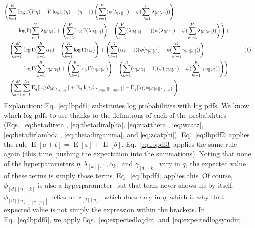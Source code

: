 \documentclass[12pt]{article}
\newcommand\numberthis{\addtocounter{equation}{1}\tag{\theequation}}
\newcommand{\E}{\operatorname{E}}
\begin{document}
\begin{align*}
    &\begin{aligned}
    &\begin{aligned}\left(\sum_{k=1}^{K} \right. &\log \Gamma(V\eta)
    - V \log \Gamma(\eta) + (\eta - 1) \left(\sum_{v=1}^{V}
    (\psi(\lambda_{[k][v]}) - \psi(\sum_{v'=1}^{V} \lambda_{[k][v']}))\right) -
    \\*
    &\left. \log \Gamma(\sum_{v=1}^{V} \lambda_{[k][v]}) +
    \left(\sum_{v=1}^{V} \log \Gamma(\lambda_{[k][v]}) \right) -
    \left(\sum_{v=1}^{V} (\lambda_{[k][v]} - 1)
    (\psi(\lambda_{[k][v]}) - \psi(\sum_{v'=1}^{V} \lambda_{[k][v']}))
    \right)\right) +\end{aligned} \\*
    &\quad\begin{aligned}\left(\sum_{d=1}^{M}\right. &\left.\log \Gamma
    (\sum_{k=1}^{K} \alpha_{k}) -
    \left(\sum_{k=1}^{K}\log \Gamma(\alpha_{k})\right) +
    \left(\sum_{k=1}^{K}(\alpha_{k} - 1)
    (\psi(\gamma_{[d][v]}) - \psi(\sum_{k'=1}^{K} \gamma_{[d][k']}))
    \right)
    \right. - \\*
    &\left.\log \Gamma(\sum_{k=1}^{K} \gamma_{[d][k]}) +
    \left(\sum_{k=1}^{K} \log \Gamma(\gamma_{[d][k]})\right) -
    \left(\sum_{k=1}^{K} (\gamma_{[d][k]} - 1)
    (\psi(\gamma_{[d][v]}) - \psi(\sum_{k'=1}^{K} \gamma_{[d][k']}))
    \right)\right) +
    \end{aligned}\\*
    &\quad\begin{aligned}
    \left(\sum_{d=1}^{M}\sum_{n=1}^{N_{d}} \E_{q}[\log \theta_{[d][z_{[d][n]}]}]
    + \E_{q}[\log \beta_{[z_{[d][n]}][w_{[d][n]}]}] -
    \E_{q}[\log \phi_{[d][n][z_{[d][n]}]}]\right).
    \end{aligned}
    \end{aligned}\numberthis\label{eq:lbpdf5}\\
\end{align*}
Explanation:  Eq.~\ref{eq:lbpdf1} substitutes log probabilities with log pdfs.
We know which log pdfs to use thanks to the definitions of each of the
probabilities (Eqs.~\ref{eq:betadireta}, \ref{eq:thetadiralpha},
\ref{eq:zcattheta}, \ref{eq:wcatz}, \ref{eq:betadirlambda},
\ref{eq:thetadirgamma}, and \ref{eq:zcatphi}).  Eq.~\ref{eq:lbpdf2} applies the
rule $\E[a+b] = \E[a]+\E[b]$.  Eq.~\ref{eq:lbpdf3} applies the same rule again
(this time, pushing the expectation into the summations).  Noting that none of
the hyperparameters $\eta$, $\lambda_{[k][v]}, \alpha_{k},$ and
$\gamma_{[d][k]}$ vary in $q$, the expected value of these terms is simply those
terms; Eq.~\ref{eq:lbpdf4} applies this.  Of course, $\phi_{[d][n][k]}$ is also
a hyperparameter, but that term never shows up by itself:
$\phi_{[d][n][z_{[d][n]}]}$ relies on $z_{[d][n]}$, which does vary in $q$,
which is why that expected value is not simply the expression within the
brackets.  In Eq.~\ref{eq:lbpdf5}, we apply
Eqs.~\ref{eq:expectedlogdir}~and~\ref{eq:expectedlogsymdir}.
\end{document}
